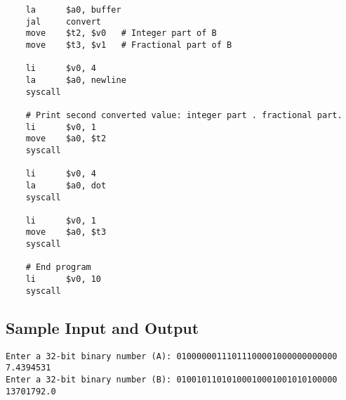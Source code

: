 \documentclass[a4paper]{article}
\begin{document}
\begin{verbatim}
    la      $a0, buffer
    jal     convert
    move    $t2, $v0   # Integer part of B
    move    $t3, $v1   # Fractional part of B

    li      $v0, 4
    la      $a0, newline
    syscall

    # Print second converted value: integer part . fractional part.
    li      $v0, 1
    move    $a0, $t2
    syscall

    li      $v0, 4
    la      $a0, dot
    syscall

    li      $v0, 1
    move    $a0, $t3
    syscall

    # End program
    li      $v0, 10
    syscall
\end{verbatim}

\vspace{3mm}
\subsection*{Sample Input and Output}
\begin{verbatim}
Enter a 32-bit binary number (A): 01000000111011100001000000000000
7.4394531
Enter a 32-bit binary number (B): 01001011010100010001001010100000
13701792.0
\end{verbatim}
\end{document}
